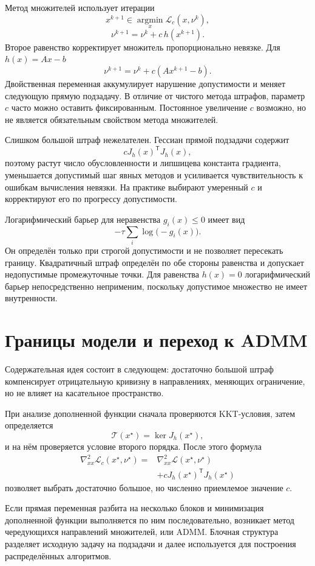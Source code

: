 Метод множителей использует итерации
\[
    x^{k+1}
    \in
    \operatorname*{argmin}_x
    \mathcal L_c(x,\nu^k),
\]
\[
    \nu^{k+1}
    =
    \nu^k+c\,h(x^{k+1}).
\]
Второе равенство корректирует множитель пропорционально невязке.
Для \(h(x)=Ax-b\)
\[
    \nu^{k+1}
    =
    \nu^k+c(Ax^{k+1}-b).
\]
Двойственная переменная аккумулирует нарушение допустимости и меняет
следующую прямую подзадачу. В отличие от чистого метода штрафов,
параметр \(c\) часто можно оставить фиксированным. Постоянное увеличение \(c\) возможно, но не является обязательным свойством метода множителей.

Слишком большой штраф нежелателен. Гессиан прямой подзадачи содержит
\[
    cJ_h(x)^{\mathsf T}J_h(x),
\]
поэтому растут число обусловленности и липшицева константа градиента,
уменьшается допустимый шаг явных методов и усиливается чувствительность
к ошибкам вычисления невязки. На практике выбирают умеренный \(c\) и
корректируют его по прогрессу допустимости.

Логарифмический барьер для неравенства \(g_i(x)\le0\) имеет вид
\[
    -\tau\sum_i\log\bigl(-g_i(x)\bigr).
\]
Он определён только при строгой допустимости и не позволяет пересекать
границу. Квадратичный штраф определён по обе стороны равенства и
допускает недопустимые промежуточные точки. Для равенства
\(h(x)=0\) логарифмический барьер непосредственно неприменим, поскольку
допустимое множество не имеет внутренности.

\section{Границы модели и переход к ADMM}

Содержательная идея состоит в следующем: достаточно большой
штраф компенсирует отрицательную кривизну в направлениях, меняющих
ограничение, но не влияет на касательное пространство.

При анализе дополненной функции сначала проверяются KKT-условия, затем
определяется
\[
    \mathcal T(x^\star)=\ker J_h(x^\star),
\]
и на нём проверяется условие второго порядка. После этого формула
\[
\begin{aligned}
    \nabla_{xx}^2
    \mathcal L_c(x^\star,\nu^\star)
    ={}&
    \nabla_{xx}^2
    \mathcal L(x^\star,\nu^\star)
    \\
    &+
    cJ_h(x^\star)^{\mathsf T}J_h(x^\star)
\end{aligned}
\]
позволяет выбрать достаточно большое, но численно приемлемое значение
\(c\).

Если прямая переменная разбита на несколько блоков и минимизация
дополненной функции выполняется по ним последовательно, возникает
метод чередующихся направлений множителей, или ADMM. Блочная структура
разделяет исходную задачу на подзадачи и далее используется для
построения распределённых алгоритмов.
